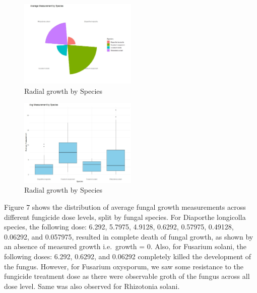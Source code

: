 \documentclass[
  10pt,
  letterpaper,
  twocolumn]{article}
\begin{document}
\begin{figure}

{\centering \includegraphics[width=0.5\textwidth,height=\textheight]{Fig4.jpeg}

}

\caption{Radial growth by Species}

\end{figure}

\begin{figure}

{\centering \includegraphics[width=0.5\textwidth,height=\textheight]{Fig6.jpeg}

}

\caption{Radial growth by Species}

\end{figure}

Figure 7 shows the distribution of average fungal growth measurements
across different fungicide dose levels, split by fungal species. For
Diaporthe longicolla species, the following dose: 6.292, 5.7975, 4.9128,
0.6292, 0.57975, 0.49128, 0.06292, and 0.057975, resulted in complete
death of fungal growth, as shown by an absence of measured growth
i.e.~growth = 0. Also, for Fusarium solani, the following doses: 6.292,
0.6292, and 0.06292 completely killed the development of the fungus.
However, for Fusarium oxysporum, we saw some resistance to the fungicide
treatment dose as there were observable groth of the fungus across all
dose level. Same was also observed for Rhizotonia solani.
\end{document}
